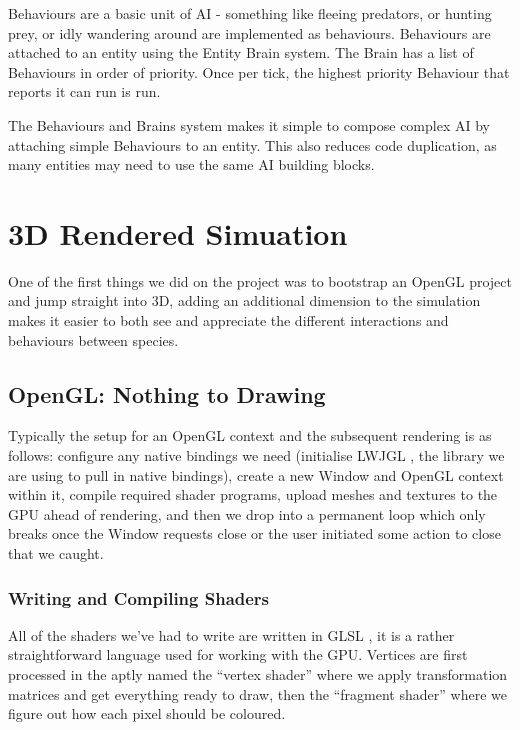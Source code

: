 \documentclass{article}
\begin{document}
\begin{multicols}{2}
        Behaviours are a basic unit of AI - something like fleeing predators, or hunting prey, or idly wandering around are implemented as behaviours. Behaviours are attached to an entity using the Entity Brain system. The Brain has a list of Behaviours in order of priority. Once per tick, the highest priority Behaviour that reports it can run is run.
        
        The Behaviours and Brains system makes it simple to compose complex AI by attaching simple Behaviours to an entity. This also reduces code duplication, as many entities may need to use the same AI building blocks.

        \section{3D Rendered Simuation}

            One of the first things we did on the project was to bootstrap an OpenGL project and jump straight into 3D, adding an additional dimension to the simulation makes it easier to both see and appreciate the different interactions and behaviours between species.

            \subsection{OpenGL: Nothing to Drawing}

                Typically the setup for an OpenGL context and the subsequent rendering is as follows: configure any native bindings we need (initialise LWJGL \cite{LWJGL}, the library we are using to pull in native bindings), create a new Window and OpenGL context within it, compile required shader programs, upload meshes and textures to the GPU ahead of rendering, and then we drop into a permanent loop which only breaks once the Window requests close or the user initiated some action to close that we caught.

                \subsubsection{Writing and Compiling Shaders}

                    All of the shaders we've had to write are written in GLSL \cite{GLSL}, it is a rather straightforward language used for working with the GPU. Vertices are first processed in the aptly named the ``vertex shader'' where we apply transformation matrices and get everything ready to draw, then the ``fragment shader'' where we figure out how each pixel should be coloured. 


\end{multicols}
\end{document}
